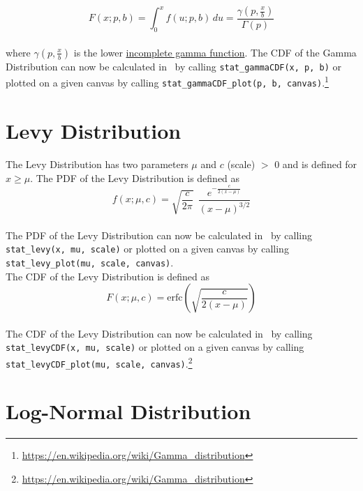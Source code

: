 		$$F(x;p,b) = \int_0^x f(u;p,b)\,du = \frac{\gamma\left(p, \frac{x}{b}\right)}{\Gamma(p)}$$
		\\[0.3cm]
		where $\gamma\left(p, \frac{x}{b}\right)$ is the lower \href{https://en.wikipedia.org/wiki/Incomplete_gamma_function}{incomplete gamma function}. The \ac{CDF} of the Gamma Distribution can now be calculated in \setlx\ by calling \lstinline{stat_gammaCDF(x, p, b)} or plotted on a given canvas by calling \lstinline{stat_gammaCDF_plot(p, b, canvas)}.\footnote{\url{https://en.wikipedia.org/wiki/Gamma_distribution}}


	\section{Levy Distribution}
	
		The Levy Distribution has two parameters $\mu$ and $c$ (scale) $>$ 0 and is defined for $x \geq \mu$. The \ac{PDF} of the Levy Distribution is defined as
		\\[0.3cm]
		$$f(x;\mu,c)=\sqrt{\frac{c}{2\pi}}~~\frac{e^{ -\frac{c}{2(x-\mu)}}} {(x-\mu)^{3/2}}$$
		\\[0.3cm]
		The \ac{PDF} of the Levy Distribution can now be calculated in \setlx\ by calling \lstinline{stat_levy(x, mu, scale)} or plotted on a given canvas by calling \lstinline{stat_levy_plot(mu, scale, canvas)}.
		\\[0.3cm]
		The \ac{CDF} of the Levy Distribution is defined as
		\\[0.3cm]
		$$F(x;\mu,c)=\textrm{erfc}\left(\sqrt{\frac{c}{2(x-\mu)}}\right)$$
		\\[0.3cm]
		The \ac{CDF} of the Levy Distribution can now be calculated in \setlx\ by calling \lstinline{stat_levyCDF(x, mu, scale)} or plotted on a given canvas by calling \lstinline{stat_levyCDF_plot(mu, scale, canvas)}.\footnote{\url{https://en.wikipedia.org/wiki/Gamma_distribution}}

	\section{Log-Normal Distribution}
	

